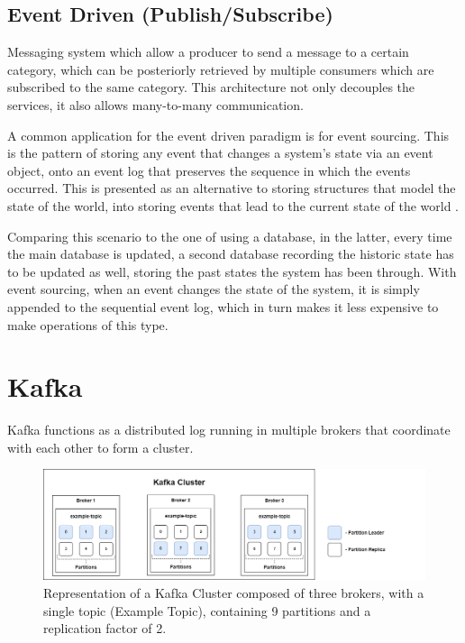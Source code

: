 \subsection{Event Driven (Publish/Subscribe)}

Messaging system which allow a producer to send a message to a certain category,
which can be posteriorly retrieved by multiple consumers which are subscribed to
the same category. This architecture not only decouples the services, it also
allows many-to-many communication.

A common application for the event driven paradigm is for event sourcing. This
is the pattern of storing any event that changes a system's state via an event
object, onto an event log that preserves the sequence in which the events
occurred. This is presented as an alternative to storing structures that model
the state of the world, into storing events that lead to the current state of
the world \cite[Chapter~5]{nadareishvili2016microservice}.

Comparing this scenario to the one of using a database, in the latter, every
time the main database is updated, a second database recording the historic
state has to be updated as well, storing the past states the system has been
through. With event sourcing, when an event changes the state of the system, it
is simply appended to the sequential event log, which in turn makes it less
expensive to make operations of this type.

\section{Kafka}

Kafka functions as a distributed log running in multiple brokers that coordinate
with each other to form a cluster.

\begin{figure}[H] 
    \centering
    \includegraphics[width=\textwidth]{images/infrastructure/Kafka Cluster.png}
    \caption{
        Representation of a Kafka Cluster composed of three brokers, with a
        single topic (Example Topic), containing 9 partitions and a
        replication factor of 2.
    } 
    \label{fig:kafka_cluster} 
\end{figure}

